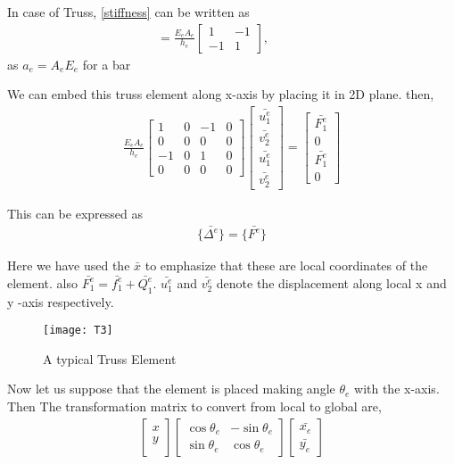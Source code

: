 In case of Truss, \ref{stiffness} can be written as
\begin{eqnarray}
	[K^e] = \frac{E_e A_e}{h_e}
\begin{bmatrix}
	1 & -1\\
	-1 & 1
\end{bmatrix},\quad\quad\quad
\end{eqnarray}
as $a_e = A_e E_e$ for a bar

We can embed this truss element along x-axis by placing it in 2D plane.
then,
\begin{eqnarray}
	\frac{E_e A_e}{h_e}
	\begin{bmatrix}
		1 & 0 & -1 & 0\\
		0 & 0 & 0 & 0\\
		-1 & 0 & 1 & 0\\
		0 & 0 & 0 & 0
	\end{bmatrix}
	\begin{bmatrix}
		\bar{u_1^e} \\
		\bar{v_2^e} \\
		\bar{u_1^e} \\
		\bar{v_2^e}
	\end{bmatrix}
	= 	\begin{bmatrix}
		\bar{F_1^e} \\
		0 \\
		\bar{F_1^e} \\
		0
	\end{bmatrix}
\end{eqnarray}

This can be expressed as
\begin{eqnarray}	
	[\bar{K^e}]\{\bar{\Delta^e}\} = \{\bar{F^e}\}
\end{eqnarray}

Here we have used the $\bar{x}$  to emphasize that these are local coordinates of the element.
also $\bar{F_1^e} = \bar{f_1^e} + \bar{Q_1^e}$. $\bar{u_1^e}$ and $ \bar{v_2^e} $ denote the displacement along local x and y -axis respectively. 
    \begin{figure}[h!]
	\centering
	\texttt{[image: T3]}
	\caption{A typical Truss Element}
\end{figure}
Now let us suppose that the element is placed making angle $\theta_e$ with the x-axis. Then The transformation matrix to convert from local to global are,
\begin{eqnarray}
	\begin{bmatrix}
	x \\
	y \\
	\end{bmatrix}
	\begin{bmatrix}
		\cos{\theta_e} & -\sin{\theta_e} \\
		\sin{\theta_e} & \cos{\theta_e} 
	\end{bmatrix}
	\begin{bmatrix}
		\bar{x_e} \\
		\bar{y_e}
	\end{bmatrix}
\end{eqnarray}

